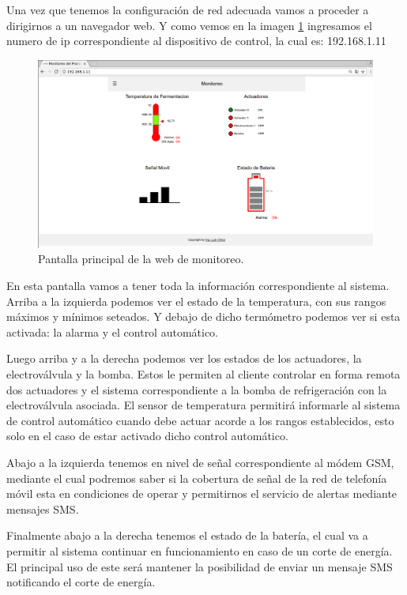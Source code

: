 Una vez que tenemos la configuración de red adecuada vamos a proceder a dirigirnos a un navegador web. Y como vemos en la imagen \ref{fig:web_monitoreo} ingresamos el numero de ip correspondiente al dispositivo de control, la cual es: 192.168.1.11 

\begin{figure}[h]
  \centering
  \includegraphics[scale=.25]{./Figures/web_monitoreo.png}
  \caption{Pantalla principal de la web de monitoreo.}
  \label{fig:web_monitoreo}
\end{figure}

En esta pantalla vamos a tener toda la información correspondiente al sistema. Arriba a la izquierda podemos ver el estado de la temperatura, con sus rangos máximos y mínimos seteados. Y debajo de dicho termómetro podemos ver si esta activada: la alarma y el control automático.

Luego arriba y a la derecha podemos ver los estados de los actuadores, la electroválvula y la bomba. Estos le permiten al cliente controlar en forma remota dos actuadores y el sistema correspondiente a la bomba de refrigeración con la electroválvula asociada. El sensor de temperatura permitirá informarle al sistema de control automático cuando debe actuar acorde a los rangos establecidos, esto solo en el caso de estar activado dicho control automático. 

Abajo a la izquierda tenemos en nivel de señal correspondiente al módem GSM, mediante el cual podremos saber si la cobertura de señal de la red de telefonía móvil esta en condiciones de operar y permitirnos el servicio de alertas mediante mensajes SMS. 

Finalmente abajo a la derecha tenemos el estado de la batería, el cual va a permitir al sistema continuar en funcionamiento en caso de un corte de energía. El principal uso de este será mantener la posibilidad de enviar un mensaje SMS notificando el corte de energía.

